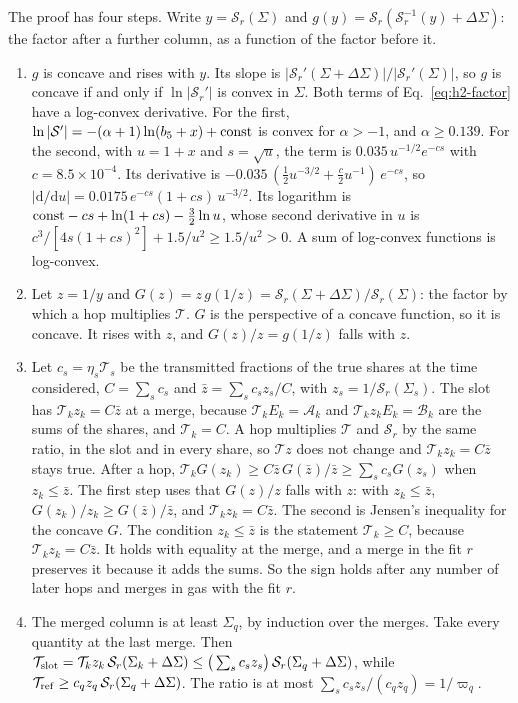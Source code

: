 The proof has four steps. Write $y=\mathcal S_r(\Sigma)$ and
$g(y)=\mathcal S_r(\mathcal S_r^{-1}(y)+\Delta\Sigma)$: the factor after a further
column, as a function of the factor before it.
\begin{enumerate}
  \item $g$ is concave and rises with $y$. Its slope is
    $|\mathcal S_r'(\Sigma+\Delta\Sigma)|/|\mathcal S_r'(\Sigma)|$, so $g$ is concave if
    and only if $\ln|\mathcal S_r'|$ is convex in $\Sigma$. Both terms of
    Eq.~\eqref{eq:h2-factor} have a log-convex derivative. For the first,
    $\ln|\mathcal S'|=-(\alpha+1)\ln(b_5+x)+{\rm const}$ is convex for
    $\alpha>-1$, and $\alpha\ge0.139$. For the second, with $u=1+x$ and
    $s=\sqrt u$, the term is $0.035\,u^{-1/2}e^{-cs}$ with
    $c=8.5\times10^{-4}$. Its derivative is
    $-0.035\,(\tfrac12u^{-3/2}+\tfrac{c}{2}u^{-1})\,e^{-cs}$, so
    $|\mathrm d/\mathrm du|=0.0175\,e^{-cs}(1+cs)\,u^{-3/2}$. Its logarithm is
    ${\rm const}-cs+\ln(1+cs)-\tfrac32\ln u$, whose second derivative in $u$ is
    $c^3/[4s(1+cs)^2]+1.5/u^2\ge1.5/u^2>0$. A sum of log-convex functions is
    log-convex.
  \item Let $z=1/y$ and $G(z)=z\,g(1/z)=\mathcal S_r(\Sigma+\Delta\Sigma)/\mathcal S_r(\Sigma)$:
    the factor by which a hop multiplies $\mathcal T$. $G$ is the perspective of a
    concave function, so it is concave. It rises with $z$, and $G(z)/z=g(1/z)$
    falls with $z$.
  \item Let $c_s=\eta_s\mathcal T_s$ be the transmitted fractions of the true
    shares at the time considered, $C=\sum_s c_s$ and $\bar z=\sum_s c_s z_s/C$, with
    $z_s=1/\mathcal S_r(\Sigma_s)$. The slot has $\mathcal T_k z_k=C\bar z$ at a
    merge, because $\mathcal T_kE_k=\mathcal A_k$ and $\mathcal T_kz_kE_k=\mathcal B_k$ are the
    sums of the shares, and $\mathcal T_k=C$. A hop multiplies $\mathcal T$ and
    $\mathcal S_r$ by the same ratio, in the slot and in every share, so
    $\mathcal T z$ does not change and $\mathcal T_kz_k=C\bar z$ stays true. After a hop,
    $\mathcal T_k G(z_k)\ge C\bar z\,G(\bar z)/\bar z\ge\sum_s c_sG(z_s)$ when
    $z_k\le\bar z$. The first step uses that $G(z)/z$ falls with $z$: with
    $z_k\le\bar z$, $G(z_k)/z_k\ge G(\bar z)/\bar z$, and
    $\mathcal T_kz_k=C\bar z$. The second is Jensen's inequality for the
    concave $G$. The condition $z_k\le\bar z$ is the statement
    $\mathcal T_k\ge C$, because $\mathcal T_kz_k=C\bar z$. It holds with
    equality at the merge, and a merge in the fit $r$ preserves it because it
    adds the sums. So the sign holds after any number of later hops and merges
    in gas with the fit $r$.
  \item The merged column is at least $\Sigma_q$, by induction over the
    merges. Take every quantity at the last merge. Then
    $\mathcal T_{\rm slot}=\mathcal T_kz_k\,\mathcal S_r(\Sigma_k+\Delta\Sigma)
    \le\big(\sum_sc_sz_s\big)\,\mathcal S_r(\Sigma_q+\Delta\Sigma)$,
    while $\mathcal T_{\rm ref}\ge c_qz_q\,\mathcal S_r(\Sigma_q+\Delta\Sigma)$. The ratio is at most
    $\sum_sc_sz_s/(c_qz_q)=1/\varpi_q$.
\end{enumerate}

